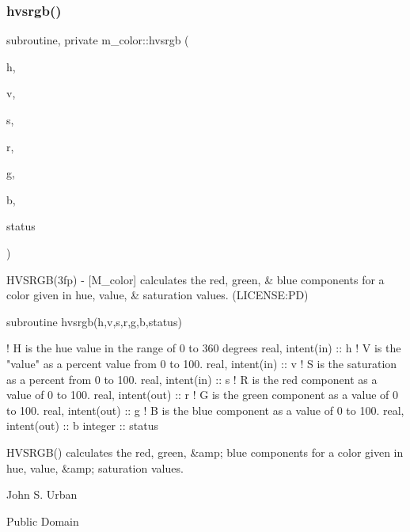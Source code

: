 \subsubsection{\texorpdfstring{hvsrgb()}{hvsrgb()}}
{\footnotesize\ttfamily subroutine, private m\+\_\+color\+::hvsrgb (\begin{DoxyParamCaption}\item[{real, intent(in)}]{h,  }\item[{real, intent(in)}]{v,  }\item[{real, intent(in)}]{s,  }\item[{real, intent(out)}]{r,  }\item[{real, intent(out)}]{g,  }\item[{real, intent(out)}]{b,  }\item[{integer}]{status }\end{DoxyParamCaption})\hspace{0.3cm}{\ttfamily [private]}}


\begin{DoxyDescription}
\item[\label{_HVSRGB}%
N\+A\+ME ]H\+V\+S\+R\+G\+B(3fp) -\/ \mbox{[}M\+\_\+color\mbox{]} calculates the red, green, \& blue components for a color given in hue, value, \& saturation values. (L\+I\+C\+E\+N\+SE\+:PD) 


\item[S\+Y\+N\+O\+P\+S\+IS ]
\begin{DoxyPre}
    subroutine hvsrgb(h,v,s,r,g,b,status)\end{DoxyPre}



\begin{DoxyPre}     ! H is the hue value in the range of 0 to 360 degrees
     real, intent(in)  :: h
     ! V is the "value" as a percent value from 0 to 100.
     real, intent(in)  :: v
     ! S is the saturation as a percent from 0 to 100.
     real, intent(in)  :: s
     ! R is the red component as a value of 0 to 100.
     real, intent(out) :: r
     ! G is the green component as a value of 0 to 100.
     real, intent(out) :: g
     ! B is the blue component as a value of 0 to 100.
     real, intent(out) :: b
     integer           :: status
    \end{DoxyPre}
 


\item[D\+E\+S\+C\+R\+I\+P\+T\+I\+ON ]\begin{DoxyVerb}HVSRGB() calculates the red, green, &amp; blue components for a
 color given in hue, value, &amp; saturation values.
\end{DoxyVerb}
 


\item[A\+U\+T\+H\+OR ]

John S. Urban




\item[L\+I\+C\+E\+N\+SE ]

Public Domain




\end{DoxyDescription}

